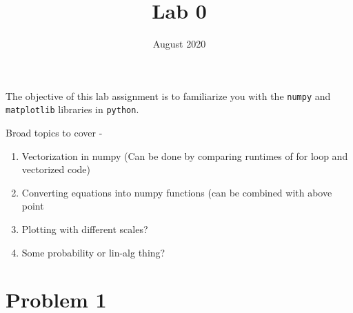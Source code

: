 \documentclass{article}
\title{Lab 0}
\date{August 2020}
\begin{document}
\maketitle
The objective of this lab assignment is to familiarize you with the \texttt{numpy} and \texttt{matplotlib} libraries in \texttt{python}.

Broad topics to cover - 
\begin{enumerate}
    \item Vectorization in numpy (Can be done by comparing runtimes of for loop and vectorized code)
    \item Converting equations into numpy functions (can be combined with above point
    \item Plotting with different scales?
    \item Some probability or lin-alg thing?
\end{enumerate}
\section{Problem 1}
\end{document}
